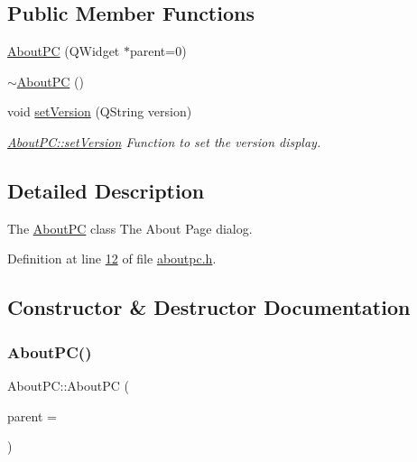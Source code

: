 \subsection*{Public Member Functions}
\begin{DoxyCompactItemize}
\item 
\mbox{\hyperlink{class_about_p_c_a89341c4427d97da60acf15dc929ad8a6}{About\+PC}} (Q\+Widget $\ast$parent=0)
\item 
\mbox{\hyperlink{class_about_p_c_a3cc0c4c81abc640d946003b078a47dd4}{$\sim$\+About\+PC}} ()
\item 
void \mbox{\hyperlink{class_about_p_c_aa3815d4826d0c8d87122449537a0a4d5}{set\+Version}} (Q\+String version)
\begin{DoxyCompactList}\small\item\em \mbox{\hyperlink{class_about_p_c_aa3815d4826d0c8d87122449537a0a4d5}{About\+P\+C\+::set\+Version}} Function to set the version display. \end{DoxyCompactList}\end{DoxyCompactItemize}


\subsection{Detailed Description}
The \mbox{\hyperlink{class_about_p_c}{About\+PC}} class The About Page dialog. 

Definition at line \mbox{\hyperlink{aboutpc_8h_source_l00012}{12}} of file \mbox{\hyperlink{aboutpc_8h_source}{aboutpc.\+h}}.



\subsection{Constructor \& Destructor Documentation}
\mbox{\label{class_about_p_c_a89341c4427d97da60acf15dc929ad8a6}} 
\subsubsection{\texorpdfstring{About\+P\+C()}{AboutPC()}}
{\footnotesize\ttfamily About\+P\+C\+::\+About\+PC (\begin{DoxyParamCaption}\item[{Q\+Widget $\ast$}]{parent = {} }\end{DoxyParamCaption})\hspace{0.3cm}{\ttfamily [explicit]}}




